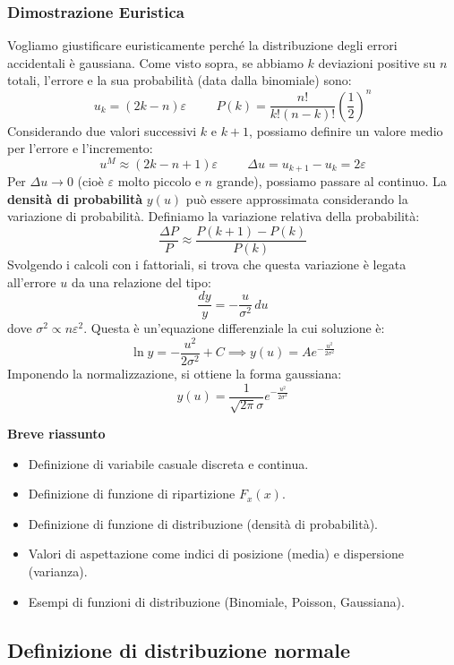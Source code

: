 \documentclass{article}
\theoremstyle{remark}
\begin{document}
\subsubsection{\color{red} Dimostrazione Euristica}
Vogliamo giustificare euristicamente perché la distribuzione degli errori accidentali è gaussiana.
Come visto sopra, se abbiamo $k$ deviazioni positive su $n$ totali, l'errore e la sua probabilità (data dalla binomiale) sono:
\[
u_k=(2k-n) \varepsilon \hspace{1cm} P(k)=\frac{n!}{k!(n-k)!} \left(\frac{1}{2}\right)^n
\]
Considerando due valori successivi $k$ e $k+1$, possiamo definire un valore medio per l'errore e l'incremento:
\[
u^M \approx (2k-n+1)\varepsilon \hspace{1cm} \Delta u = u_{k+1} - u_k = 2 \varepsilon
\]
Per $\Delta u \rightarrow 0$ (cioè $\varepsilon$ molto piccolo e $n$ grande), possiamo passare al continuo. La \textbf{densità di probabilità} $y(u)$ può essere approssimata considerando la variazione di probabilità.
Definiamo la variazione relativa della probabilità:
\[
\frac{\Delta P}{P} \approx \frac{P(k+1) - P(k)}{P(k)}
\]
Svolgendo i calcoli con i fattoriali, si trova che questa variazione è legata all'errore $u$ da una relazione del tipo:
\[
\frac{dy}{y} = -\frac{u}{\sigma^2} \, du
\]
dove $\sigma^2 \propto n\varepsilon^2$. Questa è un'equazione differenziale la cui soluzione è:
\[
\ln y = -\frac{u^2}{2\sigma^2} + C \implies y(u) = A e^{-\frac{u^2}{2\sigma^2}}
\]
Imponendo la normalizzazione, si ottiene la forma gaussiana:
\[
y(u)=\frac{1}{\sqrt{2\pi} \sigma}e^{-\frac{u^2}{2 \sigma^2}}
\]

\textbf{Breve riassunto}
\begin{itemize}[itemsep=0.3em]
    \item Definizione di variabile casuale discreta e continua.
    \item Definizione di funzione di ripartizione $F_x(x)$.
    \item Definizione di funzione di distribuzione (densità di probabilità).
    \item Valori di aspettazione come indici di posizione (media) e dispersione (varianza).
    \item Esempi di funzioni di distribuzione (Binomiale, Poisson, Gaussiana).
\end{itemize}

\subsection{Definizione di distribuzione normale}
\end{document}
